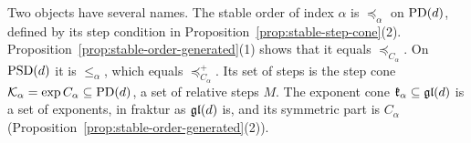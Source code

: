 Two objects have several names. The stable order of index $\alpha$ is $\preceq_\alpha$ on $\mathrm{PD}(d)$,
defined by its step condition in Proposition~\ref{prop:stable-step-cone}(2).
Proposition~\ref{prop:stable-order-generated}(1) shows that it equals $\preceq_{C_\alpha}$. On
$\mathrm{PSD}(d)$ it is $\le_\alpha$, which equals $\preceq^+_{C_\alpha}$. Its set of steps is the step cone
$\mathcal K_\alpha = \exp C_\alpha \subseteq \mathrm{PD}(d)$, a set of relative steps $M$. The exponent cone
$\mathfrak k_\alpha \subseteq \mathfrak{gl}(d)$ is a set of exponents, in fraktur as $\mathfrak{gl}(d)$ is, and its
symmetric part is $C_\alpha$ (Proposition~\ref{prop:stable-order-generated}(2)).